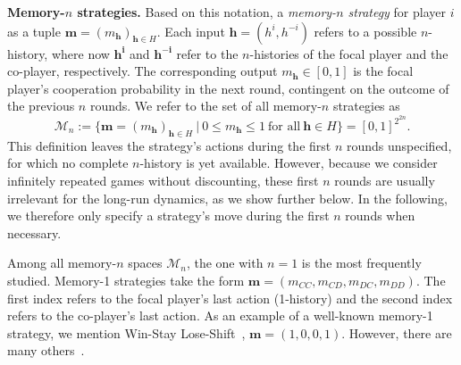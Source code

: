 \documentclass[9pt,twoside,lineno]{pnas-new}
\theoremstyle{plainCl1}
\theoremstyle{plainCl2}
\begin{document}
\noindent
{\bfseries Memory-$n$ strategies.} Based on this notation, a {\it memory-$n$ strategy}  for player $i$ as a tuple \(\mathbf{m} \!=\! (m_\mathbf{h})_{\mathbf{h}\in H}\). 
Each input $\mathbf{h}\!=\!(h^i,h^{-i})$ refers to a possible $n$-history, where now $\mathbf{h^i}$ and $\mathbf{h^{-i}}$ refer to the $n$-histories of the focal player and the co-player, respectively. 
The corresponding output $m_\mathbf{h}\!\in\![0,1]$ is the focal player's cooperation probability in the next round, contingent on  the outcome of the previous \(n\) rounds. We refer to the set of all memory-$n$ strategies as 
\begin{equation}
\mathcal{M}_n:=\Big\{ \mathbf{m}\!=\!(m_\mathbf{h})_{\mathbf{h}\in H} ~\Big|~0\!\le\!m_\mathbf{h}\!\le\!1~\text{for all}~ \mathbf{h}\!\in\! H\Big\} = [0,1]^{2^{2n}} .
\end{equation}
This definition leaves the strategy's actions during the first $n$ rounds unspecified, for which no complete $n$-history is yet available. 
However, because we consider infinitely repeated games without discounting, these first $n$ rounds are usually irrelevant for the long-run dynamics, as we show further below. 
In the following, we therefore only specify a strategy's move during the first $n$ rounds when necessary. 


Among all memory-$n$ spaces $\mathcal{M}_n$, the one with $n\!=\!1$ is the most frequently studied. 
Memory-1 strategies take the form $\mathbf{m}\!=\!(m_{CC}, m_{CD}, m_{DC}, m_{DD})$. 
The first index refers to the focal player's last action (1-history) and the second index refers to the co-player's last action. 
As an example of a well-known memory-1 strategy, we mention Win-Stay Lose-Shift~\citep{nowak:Nature:1993}, $\mathbf{m}\!=\!(1,0,0,1)$. However, there are many others~\citep{hilbe:Nature:2018}.\\

\end{document}
